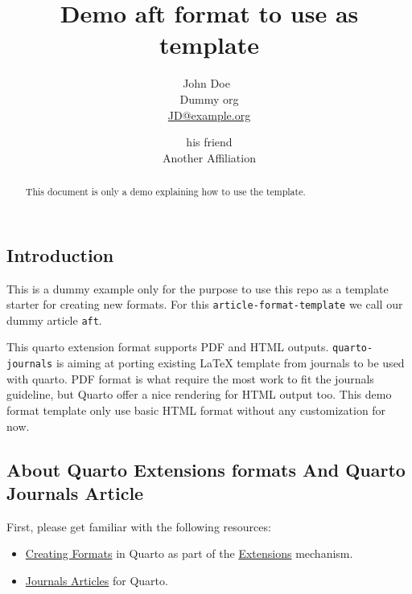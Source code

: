 \documentclass[
]{aft}
\title{Demo aft format to use as template}
\author{
John Doe~\orcidlink{0000-0000-0000-0000}\\Dummy
org\\\href{mailto:JD@example.org}{JD@example.org}\and 
his friend\\Another Affiliation\\}
\date{}
\providecommand{\tightlist}{%
  \setlength{\itemsep}{0pt}\setlength{\parskip}{0pt}}\usepackage{longtable,booktabs,array}
\begin{document}
\maketitle
\begin{abstract}
This document is only a demo explaining how to use the template.
\end{abstract}
\ifdefined\Shaded\renewenvironment{Shaded}{\begin{tcolorbox}[boxrule=0pt, breakable, sharp corners, borderline west={3pt}{0pt}{shadecolor}, interior hidden, enhanced, frame hidden]}{\end{tcolorbox}}\fi

\hypertarget{sec-intro}{%
\subsection{Introduction}\label{sec-intro}}

This is a dummy example only for the purpose to use this repo as a
template starter for creating new formats. For this
\texttt{article-format-template} we call our dummy article \texttt{aft}.

This quarto extension format supports PDF and HTML outputs.
\texttt{quarto-journals} is aiming at porting existing {\LaTeX} template
from journals to be used with quarto. PDF format is what require the
most work to fit the journals guideline, but Quarto offer a nice
rendering for HTML output too. This demo format template only use basic
HTML format without any customization for now.

\hypertarget{about-quarto-extensions-formats-and-quarto-journals-article}{%
\subsection{About Quarto Extensions formats And Quarto Journals
Article}\label{about-quarto-extensions-formats-and-quarto-journals-article}}

First, please get familiar with the following resources:

\begin{itemize}
\tightlist
\item
  \href{https://quarto.org/docs/extensions/formats.html}{Creating
  Formats} in Quarto as part of the
  \href{https://quarto.org/docs/extensions/}{Extensions} mechanism.
\item
  \href{https://quarto.org/docs/journals/}{Journals Articles} for
  Quarto.
\end{itemize}
\end{document}
